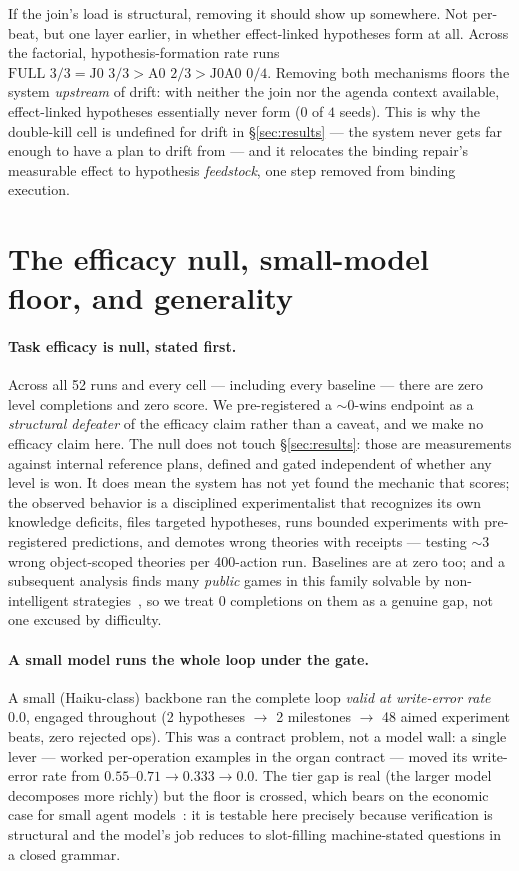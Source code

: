 \documentclass{article}
\begin{document}
If the join's load is structural, removing it should show up somewhere. Not
per-beat, but one layer earlier, in whether effect-linked hypotheses form at all.
Across the factorial, hypothesis-formation rate runs
$\text{FULL } 3/3 = \text{J0 } 3/3 > \text{A0 } 2/3 > \text{J0A0 } 0/4$. Removing
both mechanisms floors the system \emph{upstream} of drift: with neither the join
nor the agenda context available, effect-linked hypotheses essentially never form
($0$ of $4$ seeds). This is why the double-kill cell is undefined for drift in
\S\ref{sec:results} --- the system never gets far enough to have a plan to drift
from --- and it relocates the binding repair's measurable effect to hypothesis
\emph{feedstock}, one step removed from binding execution.

\section{The efficacy null, small-model floor, and generality}
\label{sec:null}

\paragraph{Task efficacy is null, stated first.} Across all 52 runs and every cell
--- including every baseline --- there are zero level completions and zero score.
We pre-registered a $\sim$0-wins endpoint as a \emph{structural defeater} of the
efficacy claim rather than a caveat, and we make no efficacy claim here. The null
does not touch \S\ref{sec:results}: those are measurements against internal
reference plans, defined and gated independent of whether any level is won. It does
mean the system has not yet found the mechanic that scores; the observed behavior is
a disciplined experimentalist that recognizes its own knowledge deficits, files
targeted hypotheses, runs bounded experiments with pre-registered predictions, and
demotes wrong theories with receipts --- testing ${\sim}3$ wrong object-scoped
theories per 400-action run. Baselines are at zero too; and a subsequent analysis
finds many \emph{public} games in this family solvable by non-intelligent
strategies~\citep{liew2026explore}, so we treat 0 completions on them as a genuine
gap, not one excused by difficulty.

\paragraph{A small model runs the whole loop under the gate.} A small (Haiku-class)
backbone ran the complete loop \emph{valid at write-error rate $0.0$}, engaged
throughout (2 hypotheses $\to$ 2 milestones $\to$ 48 aimed experiment beats, zero
rejected ops). This was a contract problem, not a model wall: a single lever ---
worked per-operation examples in the organ contract --- moved its write-error rate
from $0.55$--$0.71 \to 0.333 \to 0.0$. The tier gap is real (the larger model
decomposes more richly) but the floor is crossed, which bears on the economic case
for small agent models~\citep{belcak2025small}: it is testable here precisely
because verification is structural and the model's job reduces to slot-filling
machine-stated questions in a closed grammar.
\end{document}
